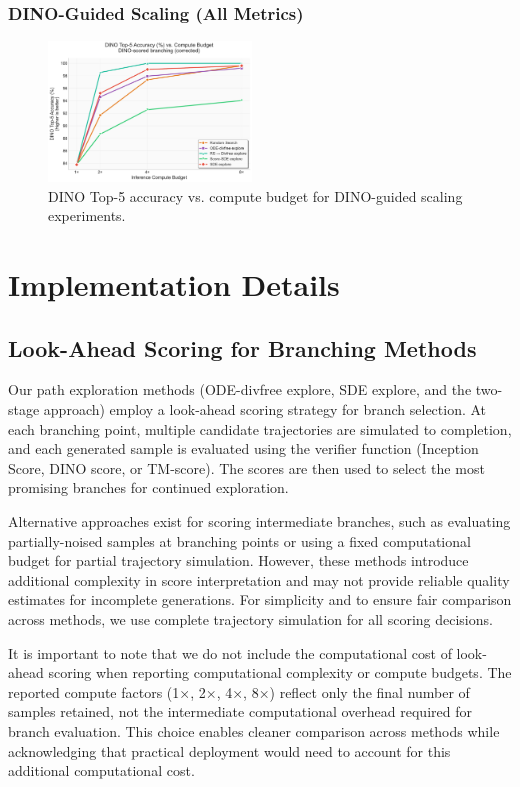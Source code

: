 \documentclass{article}
\begin{document}
\subsubsection{DINO-Guided Scaling (All Metrics)}

\begin{figure}[H]
  \centering
  \includegraphics[width=0.48\textwidth]{figures/scaling_dino_top5.pdf}
  \caption{DINO Top-5 accuracy vs. compute budget for DINO-guided scaling experiments.}
  \label{fig:dino-scaling-complete}
\end{figure}

\section{Implementation Details}

\subsection{Look-Ahead Scoring for Branching Methods}

Our path exploration methods (ODE-divfree explore, SDE explore, and the two-stage approach) employ a look-ahead scoring strategy for branch selection. At each branching point, multiple candidate trajectories are simulated to completion, and each generated sample is evaluated using the verifier function (Inception Score, DINO score, or TM-score). The scores are then used to select the most promising branches for continued exploration.

Alternative approaches exist for scoring intermediate branches, such as evaluating partially-noised samples at branching points or using a fixed computational budget for partial trajectory simulation. However, these methods introduce additional complexity in score interpretation and may not provide reliable quality estimates for incomplete generations. For simplicity and to ensure fair comparison across methods, we use complete trajectory simulation for all scoring decisions.

It is important to note that we do not include the computational cost of look-ahead scoring when reporting computational complexity or compute budgets. The reported compute factors (1×, 2×, 4×, 8×) reflect only the final number of samples retained, not the intermediate computational overhead required for branch evaluation. This choice enables cleaner comparison across methods while acknowledging that practical deployment would need to account for this additional computational cost.
\end{document}
